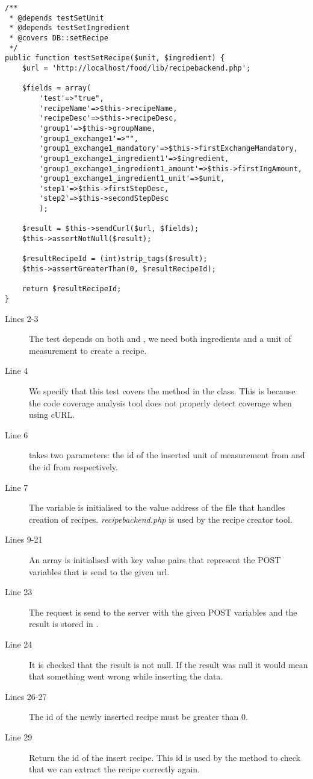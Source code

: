 \begin{lstlisting}[language=phpstyle]
/**
 * @depends testSetUnit
 * @depends testSetIngredient
 * @covers DB::setRecipe
 */
public function testSetRecipe($unit, $ingredient) {
    $url = 'http://localhost/food/lib/recipebackend.php';

    $fields = array(
        'test'=>"true",
        'recipeName'=>$this->recipeName,
        'recipeDesc'=>$this->recipeDesc,
        'group1'=>$this->groupName,
        'group1_exchange1'=>"",
        'group1_exchange1_mandatory'=>$this->firstExchangeMandatory,
        'group1_exchange1_ingredient1'=>$ingredient,
        'group1_exchange1_ingredient1_amount'=>$this->firstIngAmount,
        'group1_exchange1_ingredient1_unit'=>$unit,
        'step1'=>$this->firstStepDesc,
        'step2'=>$this->secondStepDesc
        );
    
    $result = $this->sendCurl($url, $fields);
    $this->assertNotNull($result);
        
    $resultRecipeId = (int)strip_tags($result);
    $this->assertGreaterThan(0, $resultRecipeId);
    
    return $resultRecipeId;
}
\end{lstlisting}

\begin{description}
\item[Lines 2-3] The test depends on both  and , we need both ingredients and a unit of measurement to create a recipe.
\item[Line 4] We specify that this test covers the  method in the  class. This is because the code coverage analysis tool does not properly detect coverage when using cURL\cite{curl}.
\item[Line 6]  takes two parameters: the id of the inserted unit of measurement from  and the id from  respectively.
\item[Line 7] The  variable is initialised to the value address of the file that handles creation of recipes. \textit{recipebackend.php} is used by the recipe creator tool.%
\item[Lines 9-21] An array is initialised with key value pairs that represent the POST variables that is send to the given url.
\item[Line 23] The request is send to the server with the given POST variables and the result is stored in .%
\item[Line 24] It is checked that the result is not null. If the result was null it would mean that something went wrong while inserting the data.
\item[Lines 26-27] The id of the newly inserted recipe must be greater than 0.
\item[Line 29] Return the id of the insert recipe. This id is used by the \linebreak{} method to check that we can extract the recipe correctly again.
\end{description}

